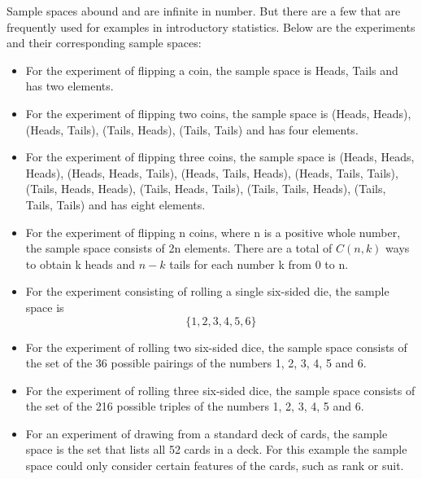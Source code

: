 \documentclass[12pt]{report}
\begin{document}
{ \Large
	
	Sample spaces abound and are infinite in number. But there are a few that are frequently used for examples in introductory statistics. Below are the experiments and their corresponding sample spaces:
	
	\begin{itemize}
		\item For the experiment of flipping a coin, the sample space is {Heads, Tails} and has two elements.
		
		\item For the experiment of flipping two coins, the sample space is {(Heads, Heads), (Heads, Tails), (Tails, Heads), (Tails, Tails) } and has four elements.
	\end{itemize}
}
{ \Large
	\begin{itemize}
		
		\item For the experiment of flipping three coins, the sample space is {(Heads, Heads, Heads), (Heads, Heads, Tails), (Heads, Tails, Heads), (Heads, Tails, Tails), (Tails, Heads, Heads), (Tails, Heads, Tails), (Tails, Tails, Heads), (Tails, Tails, Tails) } and has eight elements.
	\end{itemize}
}
{ \Large
	\begin{itemize}
		
		\item For the experiment of flipping n coins, where n is a positive whole number, the sample space consists of 2n elements. There are a total of $C(n, k)$ ways to obtain k heads and $n - k$ tails for each number k from 0 to n.
		
		\item For the experiment consisting of rolling a single six-sided die, the sample space is 
		\[\{1, 2, 3, 4, 5, 6\} \]
	\end{itemize}
}
{ \Large
	\begin{itemize}
		\item For the experiment of rolling two six-sided dice, the sample space consists of the set of the 36 possible pairings of the numbers 1, 2, 3, 4, 5 and 6.
		\item For the experiment of rolling three six-sided dice, the sample space consists of the set of the 216 possible triples of the numbers 1, 2, 3, 4, 5 and 6.
		\item For an experiment of drawing from a standard deck of cards, the sample space is the set that lists all 52 cards in a deck. For this example the sample space could only consider certain features of the cards, such as rank or suit.
	\end{itemize}
}
\end{document}
